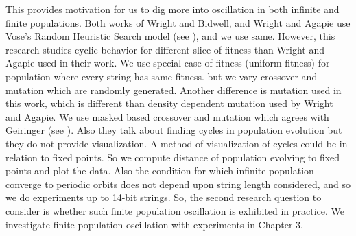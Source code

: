 \begin{itemize}
{This provides motivation for us to dig more into oscillation in both infinite and finite populations. 
Both works of Wright and Bidwell, and Wright and Agapie use Vose's Random Heuristic Search model (see \cite{Vose1999}), 
and we use same. However, this research studies cyclic behavior for different slice of fitness   
than Wright and Agapie used in their work. 
We use special case of fitness (uniform fitness) for population where every string has same fitness.
but we vary crossover and mutation which are randomly generated. 
Another difference is mutation used in this work, which is different than density dependent mutation used by 
Wright and Agapie.
We use masked based crossover and mutation which agrees with Geiringer (see \cite{Geiringer1944}). 
Also they talk about finding cycles in population evolution but they do not provide visualization. 
A method of visualization of cycles could be in relation to fixed points. 
So we compute distance of population evolving to fixed points and plot the data. 
Also the condition for which infinite population converge to periodic orbits does not depend upon string length considered, 
and so we do experiments up to 14-bit strings. 
So, the second research question to consider is whether such finite population 
oscillation is exhibited in practice. We investigate finite population oscillation with experiments 
in Chapter 3. 
}


\end{itemize}
